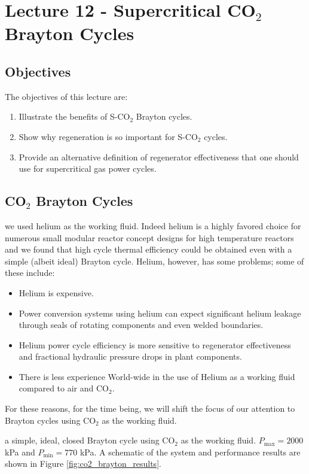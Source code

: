 \chapter{Lecture 12 - Supercritical CO$_{2}$ Brayton Cycles}
\label{ch:ch12}
\section{Objectives}
The objectives of this lecture are:
\begin{enumerate}
\item Illustrate the benefits of S-CO$_{2}$ Brayton cycles.
\item Show why regeneration is so important for S-CO$_{2}$ cycles.
\item Provide an alternative definition of regenerator effectiveness that one should use for supercritical gas power cycles.
\end{enumerate}

\section{CO$_{2}$ Brayton Cycles}

 we used helium as the working fluid.  Indeed helium is a highly favored choice for numerous small modular reactor concept designs for high temperature reactors and we found that high cycle thermal efficiency could be obtained even with a simple (albeit ideal) Brayton cycle.  Helium, however, has some problems; some of these include:\cite{dostal2006supercritical}
\begin{itemize}
\item Helium is expensive.
\item Power conversion systems using helium can expect significant helium leakage through seals of rotating components and even welded boundaries.
\item Helium power cycle efficiency is more sensitive to regenerator effectiveness and fractional hydraulic pressure drops in plant components.
\item There is less experience World-wide in the use of Helium as a working fluid compared to air and CO$_{2}$.
\end{itemize}
For these reasons, for the time being, we will shift the focus of our attention to Brayton cycles using CO$_{2}$ as the working fluid.  

 a simple, ideal, closed Brayton cycle using CO$_{2}$ as the working fluid.  $P_{\text{max}}=2000$ kPa and $P_{\text{min}}=770$ kPa.  A schematic of the system and performance results are shown in Figure \ref{fig:co2_brayton_results}.

